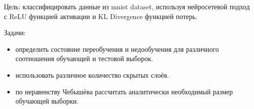 
Цель: классифицировать данные из mnist dataset, используя нейросетевой подход с ReLU функцией активации и KL Divergence функцией потерь.

Задачи:
\begin{itemize}
    \item определить состояние переобучения и недообучения для различного соотношения обучающей и тестовой выборок.
    \item использовать различное количество скрытых слоёв.
    \item по неравенству Чебышёва рассчитать аналитически необходимый размер обучающей выборки.
\end{itemize}

\clearpage
